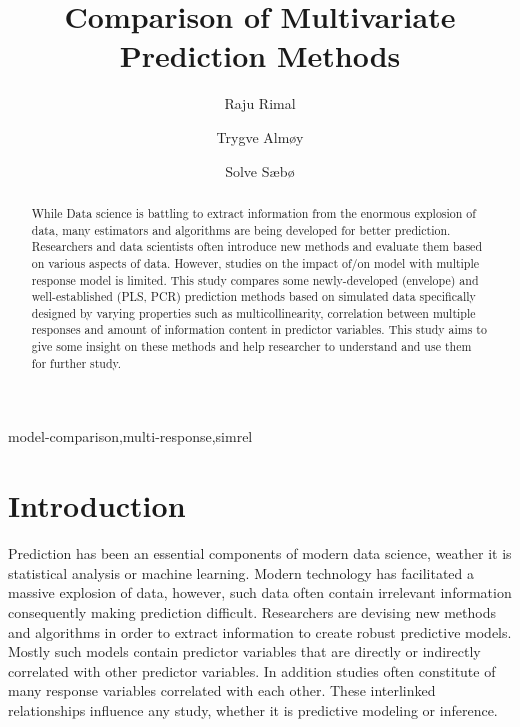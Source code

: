 \documentclass[12pt,3p,authoryear]{elsarticle}
\begin{document}
\begin{frontmatter}

  \title{Comparison of Multivariate Prediction Methods}
  
    \author[KBM]{Raju Rimal}
    \author[KBM]{Trygve Almøy}
  
    \author[NMBU]{Solve Sæbø}
  
      \address[KBM]{Faculty of Chemistry and Bioinformatics, Norwegian University of Life
Sciences, Ås, Norway}
    \address[NMBU]{Prorector, Norwegian University of Life Sciences, Ås, Norway}
  
  \begin{abstract}
  While Data science is battling to extract information from the enormous
  explosion of data, many estimators and algorithms are being developed
  for better prediction. Researchers and data scientists often introduce
  new methods and evaluate them based on various aspects of data. However,
  studies on the impact of/on model with multiple response model is
  limited. This study compares some newly-developed (envelope) and
  well-established (PLS, PCR) prediction methods based on simulated data
  specifically designed by varying properties such as multicollinearity,
  correlation between multiple responses and amount of information content
  in predictor variables. This study aims to give some insight on these
  methods and help researcher to understand and use them for further
  study.
  \end{abstract}
   \begin{keyword} model-comparison,multi-response,simrel\end{keyword}

\end{frontmatter}

\hypertarget{introduction}{%
\section{Introduction}\label{introduction}}

Prediction has been an essential components of modern data science,
weather it is statistical analysis or machine learning. Modern
technology has facilitated a massive explosion of data, however, such
data often contain irrelevant information consequently making prediction
difficult. Researchers are devising new methods and algorithms in order
to extract information to create robust predictive models. Mostly such
models contain predictor variables that are directly or indirectly
correlated with other predictor variables. In addition studies often
constitute of many response variables correlated with each other. These
interlinked relationships influence any study, whether it is predictive
modeling or inference.
\end{document}
